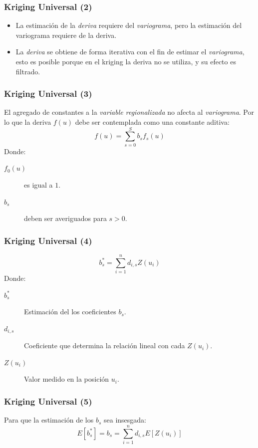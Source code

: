 \documentclass{beamer}
\begin{document}
\begin{frame}
\frametitle{Kriging Universal (2)}
\begin{itemize}
\item La estimación de la \emph{deriva} requiere del \emph{variograma}, pero la estimación del variograma requiere de la deriva.
\item La \emph{deriva} se obtiene de forma iterativa con el fin de estimar el \emph{variograma}, esto es posible porque en el kriging la deriva no se utiliza, y su efecto es filtrado.
\end{itemize}
\end{frame}

\begin{frame}
\frametitle{Kriging Universal (3)}
El agregado de constantes a la \emph{variable regionalizada} no afecta al \emph{variograma}. Por lo que la deriva $f(u)$ debe ser contemplada como una constante aditiva:
\begin{equation}
\label{eq:FormaGeneralDeLaDeriva}
f(u) = \sum_{s=0}^S b_s f_s(u)
\end{equation}
Donde:
\begin{description}
\item[$f_0(u)$] es igual a $1$.
\item[$b_s$] deben ser averiguados para $s>0$.
\end{description}
\end{frame}

\begin{frame}
\frametitle{Kriging Universal (4)}
\begin{equation}
b_s^* = \sum_{i=1}^n d_{i,s} Z(u_i)
\end{equation}
Donde:
\begin{description}
\item[$b_s^*$] Estimación del los coeficientes $b_s$.
\item[$d_{i,s}$] Coeficiente que determina la relación lineal con cada $Z(u_i)$.
\item[$Z(u_i)$] Valor medido en la posición $u_i$.
\end{description}
\end{frame}

\begin{frame}
\frametitle{Kriging Universal (5)}
Para que la estimación de los $b_s$ sea insesgada:
\begin{equation}
E[b_s^*] = b_s = \sum_{i=1}^n d_{i,s} E[Z(u_i)]
\end{equation}
\end{frame}
\end{document}
